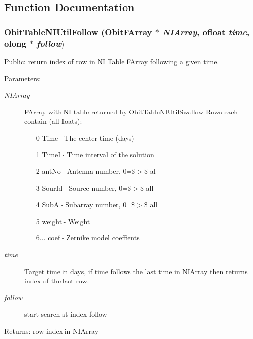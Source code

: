\subsection{Function Documentation}
\subsubsection{ Obit\-Table\-NIUtil\-Follow ({\bf Obit\-FArray} $\ast$ {\em NIArray}, {\bf ofloat} {\em time}, {\bf olong} $\ast$ {\em follow})}\label{ObitTableNIUtil_8c_a2}


Public: return index of row in NI Table FArray following a given time. 

\begin{Desc}
\item[Parameters:]
\begin{description}
\item[{\em NIArray}]FArray with NI table returned by Obit\-Table\-NIUtil\-Swallow Rows each contain (all floats): \begin{itemize}
\item [0] Time - The center time (days) \item [1] Time\-I - Time interval of the solution \item [2] ant\-No - Antenna number, 0=\$$>$\$ al \item [3] Sour\-Id - Source number, 0=\$$>$\$ all \item [4] Sub\-A - Subarray number, 0=\$$>$\$ all \item [5] weight - Weight \item [6...] coef - Zernike model coeffients \end{itemize}
\item[{\em time}]Target time in days, if time follows the last time in NIArray then returns index of the last row. \item[{\em follow}]start search at index follow \end{description}
\end{Desc}
\begin{Desc}
\item[Returns:]row index in NIArray \end{Desc}
